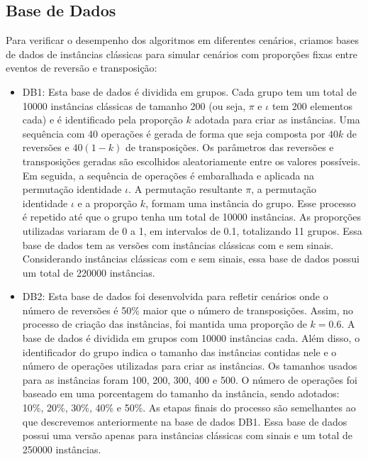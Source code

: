 \subsection{Base de Dados}

Para verificar o desempenho dos algoritmos em diferentes cenários, criamos bases de dados de instâncias clássicas para simular cenários com proporções fixas entre eventos de reversão e transposição:

\begin{itemize}
  \item DB1: Esta base de dados é dividida em grupos. Cada grupo tem um total de 10000 instâncias clássicas de tamanho 200 (ou seja, $\pi$ e $\iota$ tem 200 elementos cada) e é identificado pela proporção $k$ adotada para criar as instâncias. Uma sequência com 40 operações é gerada de forma que seja composta por $40k$ de reversões e $40(1-k)$ de transposições. Os parâmetros das reversões e transposições geradas são escolhidos aleatoriamente entre os valores possíveis. Em seguida, a sequência de operações é embaralhada e aplicada na permutação identidade $\iota$. A permutação resultante $\pi$, a permutação identidade $\iota$ e a proporção $k$, formam uma instância do grupo. Esse processo é repetido até que o grupo tenha um total de 10000 instâncias. As proporções utilizadas variaram de 0 a 1, em intervalos de 0.1, totalizando 11 grupos. Essa base de dados tem as versões com instâncias clássicas com e sem sinais. Considerando instâncias clássicas com e sem sinais, essa base de dados possui um total de 220000 instâncias.

  \item DB2: Esta base de dados foi desenvolvida para refletir cenários onde o número de reversões é 50\% maior que o número de transposições. Assim, no processo de criação das instâncias, foi mantida uma proporção de $k = 0.6$. A base de dados é dividida em grupos com 10000 instâncias cada. Além disso, o identificador do grupo indica o tamanho das instâncias contidas nele e o número de operações utilizadas para criar as instâncias. Os tamanhos usados para as instâncias foram 100, 200, 300, 400 e 500. O número de operações foi baseado em uma porcentagem do tamanho da instância, sendo adotados: 10\%, 20\%, 30\%, 40\% e 50\%. As etapas finais do processo são semelhantes ao que descrevemos anteriormente na base de dados DB1. Essa base de dados possui uma versão apenas para instâncias clássicas com sinais e um total de 250000 instâncias.
\end{itemize}


